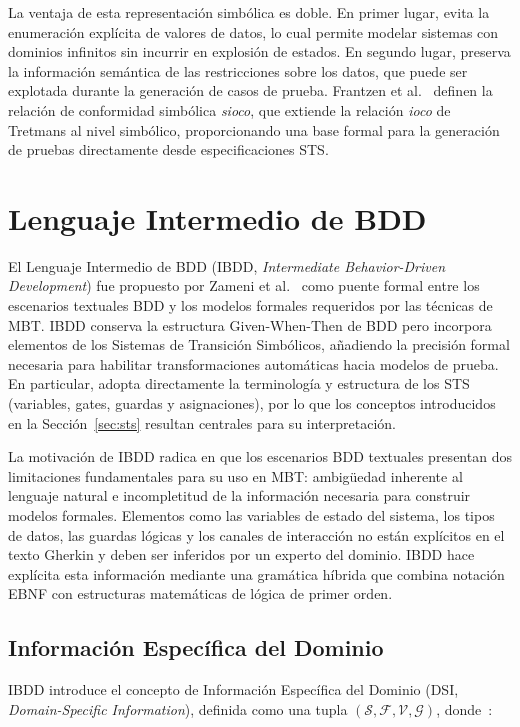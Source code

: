 La ventaja de esta representación simbólica es doble. En primer lugar, evita la enumeración explícita de valores de datos, lo cual permite modelar sistemas con dominios infinitos sin incurrir en explosión de estados. En segundo lugar, preserva la información semántica de las restricciones sobre los datos, que puede ser explotada durante la generación de casos de prueba. Frantzen et al.~\cite{frantzen2006symbolic} definen la relación de conformidad simbólica \textit{sioco}, que extiende la relación \textit{ioco} de Tretmans al nivel simbólico, proporcionando una base formal para la generación de pruebas directamente desde especificaciones STS.

\section{Lenguaje Intermedio de BDD}
\label{sec:ibdd}

El Lenguaje Intermedio de BDD (IBDD, \textit{Intermediate Behavior-Driven Development}) fue propuesto por Zameni et al.~\cite{zameni2024ibdd} como puente formal entre los escenarios textuales BDD y los modelos formales requeridos por las técnicas de MBT. IBDD conserva la estructura Given-When-Then de BDD pero incorpora elementos de los Sistemas de Transición Simbólicos, añadiendo la precisión formal necesaria para habilitar transformaciones automáticas hacia modelos de prueba. En particular, adopta directamente la terminología y estructura de los STS (variables, gates, guardas y asignaciones), por lo que los conceptos introducidos en la Sección~\ref{sec:sts} resultan centrales para su interpretación.

La motivación de IBDD radica en que los escenarios BDD textuales presentan dos limitaciones fundamentales para su uso en MBT: ambigüedad inherente al lenguaje natural e incompletitud de la información necesaria para construir modelos formales. Elementos como las variables de estado del sistema, los tipos de datos, las guardas lógicas y los canales de interacción no están explícitos en el texto Gherkin y deben ser inferidos por un experto del dominio. IBDD hace explícita esta información mediante una gramática híbrida que combina notación EBNF con estructuras matemáticas de lógica de primer orden.

\subsection{Información Específica del Dominio}

IBDD introduce el concepto de Información Específica del Dominio (DSI, \textit{Domain-Specific Information}), definida como una tupla $(\mathcal{S}, \mathcal{F}, \mathcal{V}, \mathcal{G})$, donde~\cite{zameni2024ibdd}:

